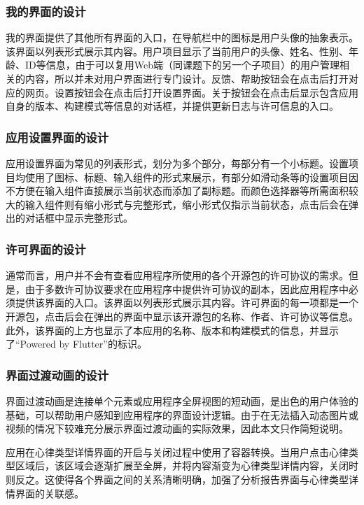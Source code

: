\subsubsection{我的界面的设计}\label{subsubsec:me-design}

我的界面提供了其他所有界面的入口，在导航栏中的图标是用户头像的抽象表示。该界面以列表形式展示其内容。用户项目显示了当前用户的头像、姓名、性别、年龄、ID等信息，由于可以复用Web端（同课题下的另一个子项目）的用户管理相关的内容，所以并未对用户界面进行专门设计。反馈、帮助按钮会在点击后打开对应的网页。设置按钮会在点击后打开设置界面。关于按钮会在点击后显示包含应用自身的版本、构建模式等信息的对话框，并提供更新日志与许可信息的入口。

\subsubsection{应用设置界面的设计}\label{subsubsec:settings-design}

应用设置界面为常见的列表形式，划分为多个部分，每部分有一个小标题。设置项目均使用了图标、标题、输入组件的形式来展示，有部分如滑动条等的设置项目因不方便在输入组件直接展示当前状态而添加了副标题。而颜色选择器等所需面积较大的输入组件则有缩小形式与完整形式，缩小形式仅指示当前状态，点击后会在弹出的对话框中显示完整形式。

\subsubsection{许可界面的设计}\label{subsubsec:license-design}

通常而言，用户并不会有查看应用程序所使用的各个开源包的许可协议的需求。但是，由于多数许可协议要求在应用程序中提供许可协议的副本，因此应用程序中必须提供该界面的入口。该界面以列表形式展示其内容。许可界面的每一项都是一个开源包，点击后会在弹出的界面中显示该开源包的名称、作者、许可协议等信息。此外，该界面的上方也显示了本应用的名称、版本和构建模式的信息，并显示了“Powered by Flutter”的标识。

\subsubsection{界面过渡动画的设计}\label{subsubsec:transition-design}

界面过渡动画是连接单个元素或应用程序全屏视图的短动画，是出色的用户体验的基础，可以帮助用户感知到应用程序的界面设计逻辑。由于在无法插入动态图片或视频的情况下较难充分展示界面过渡动画的实际效果，因此本文只作简短说明。

应用在心律类型详情界面的开启与关闭过程中使用了容器转换。当用户点击心律类型区域后，该区域会逐渐扩展至全屏，并将内容渐变为心律类型详情内容，关闭时则反之。这使得各个界面之间的关系清晰明确，加强了分析报告界面与心律类型详情界面的关联感。

